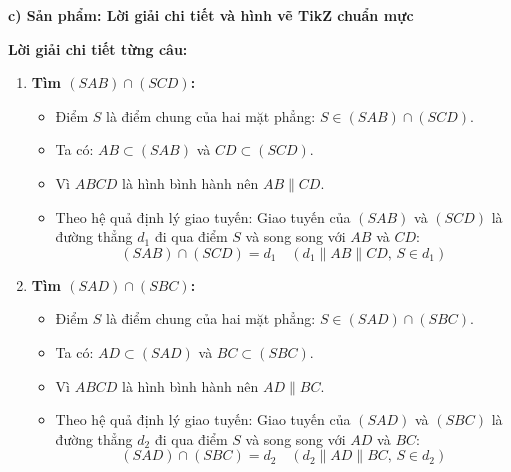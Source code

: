 \documentclass[12pt, a4paper]{article}
\begin{document}
\noindent \textbf{c) Sản phẩm: Lời giải chi tiết và hình vẽ TikZ chuẩn mực}
\begin{center}
\end{center}

\textbf{Lời giải chi tiết từng câu:}
\begin{enumerate}[leftmargin=0.6cm]
    \item \textbf{Tìm $(SAB) \cap (SCD)$:}
    \begin{itemize}
        \item Điểm $S$ là điểm chung của hai mặt phẳng: $S \in (SAB) \cap (SCD)$.
        \item Ta có: $AB \subset (SAB)$ và $CD \subset (SCD)$.
        \item Vì $ABCD$ là hình bình hành nên $AB \parallel CD$.
        \item Theo hệ quả định lý giao tuyến: Giao tuyến của $(SAB)$ và $(SCD)$ là đường thẳng $d_1$ đi qua điểm $S$ và song song với $AB$ và $CD$:
        $$(SAB) \cap (SCD) = d_1 \quad (d_1 \parallel AB \parallel CD, \, S \in d_1)$$
    \end{itemize}

    \item \textbf{Tìm $(SAD) \cap (SBC)$:}
    \begin{itemize}
        \item Điểm $S$ là điểm chung của hai mặt phẳng: $S \in (SAD) \cap (SBC)$.
        \item Ta có: $AD \subset (SAD)$ và $BC \subset (SBC)$.
        \item Vì $ABCD$ là hình bình hành nên $AD \parallel BC$.
        \item Theo hệ quả định lý giao tuyến: Giao tuyến của $(SAD)$ và $(SBC)$ là đường thẳng $d_2$ đi qua điểm $S$ và song song với $AD$ và $BC$:
        $$(SAD) \cap (SBC) = d_2 \quad (d_2 \parallel AD \parallel BC, \, S \in d_2)$$
    \end{itemize}
\end{enumerate}
\end{document}
